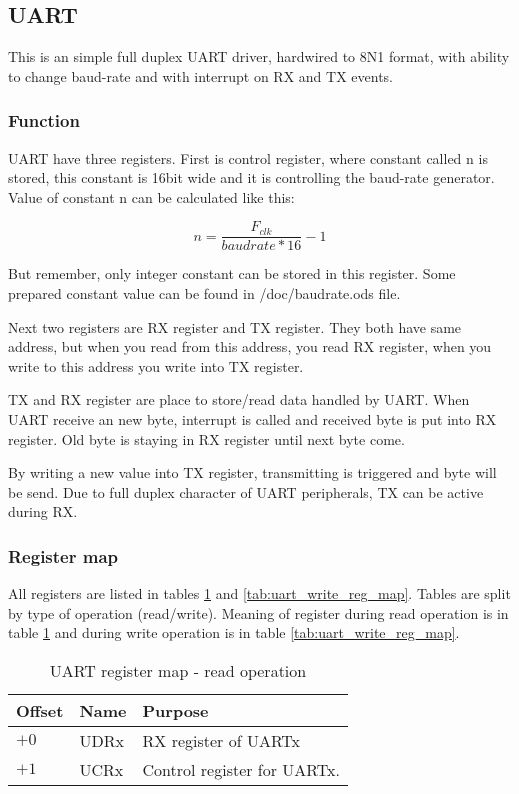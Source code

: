 \subsection{UART}

This is an simple full duplex UART driver, hardwired to 8N1 format, with
ability to change baud-rate and with interrupt on RX and TX events.

\subsubsection{Function}

UART have three registers. First is control register, where constant called n
is stored, this constant is 16bit wide and it is controlling the baud-rate
generator. Value of constant n can be calculated like this:

$$
    n = \frac{F_{clk}}{baudrate*16} - 1
$$

But remember, only integer constant can be stored in this register. Some
prepared constant value can be found in /doc/baudrate.ods file.

Next two registers are RX register and TX register. They both have same
address, but when you read from this address, you read RX register, when you
write to this address you write into TX register.

TX and RX register are place to store/read data handled by UART. When UART
receive an new byte, interrupt is called and received byte is put into RX
register. Old byte is staying in RX register until next byte come.

By writing a new value into TX register, transmitting is triggered and byte
will be send. Due to full duplex character of UART peripherals, TX can be
active during RX.

\subsubsection{Register map}

All registers are listed in tables \ref{tab:uart_read_reg_map} and
\ref{tab:uart_write_reg_map}. Tables are split by type of operation
(read/write). Meaning of register during read operation is in table
\ref{tab:uart_read_reg_map} and during write operation is in table
\ref{tab:uart_write_reg_map}.

\begin{table}[h]
    \centering
    \begin{tabular}{|l|l|l|}
        \hline
        \textbf{Offset} & \textbf{Name} & \textbf{Purpose}            \\ \hline
        $+0$            & UDRx          & RX register of UARTx        \\ \hline
        $+1$            & UCRx          & Control register for UARTx. \\ \hline
    \end{tabular}
    \caption{UART register map - read operation}
    \label{tab:uart_read_reg_map}
\end{table}

